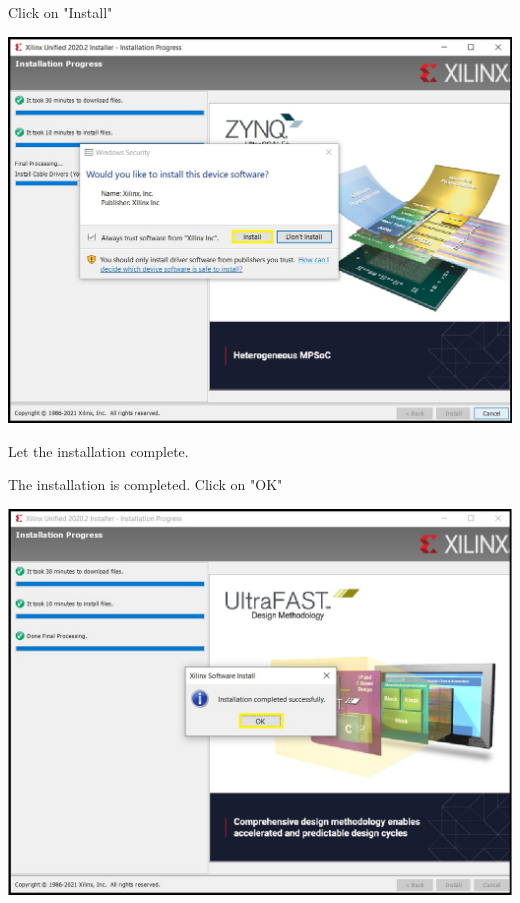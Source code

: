 \begin{minipage}{\linewidth}
  Click on "Install"
  \\
  \begin{center}
    \includegraphics[width=0.7\linewidth]{images/VivadoInstimg018.jpg}
  \end{center}
  Let the installation complete.
\end{minipage}

\begin{minipage}{\linewidth}
  The installation is completed. Click on "OK"
  \\
  \begin{center}
    \includegraphics[width=0.7\linewidth]{images/VivadoInstimg019.jpg}
  \end{center}
\end{minipage}

